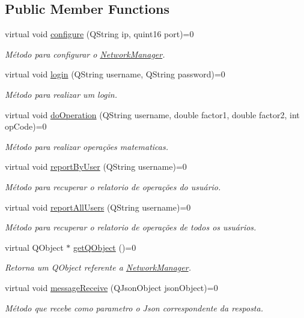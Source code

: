 \subsection*{Public Member Functions}
\begin{DoxyCompactItemize}
\item 
virtual void \hyperlink{classNetworkManager_ae7b073b1deb224a6cb7af0e4d3d158de}{configure} (Q\+String ip, quint16 port)=0
\begin{DoxyCompactList}\small\item\em Método para configurar o \hyperlink{classNetworkManager}{Network\+Manager}. \end{DoxyCompactList}\item 
virtual void \hyperlink{classNetworkManager_ad39555f78185618bb5e6e906a9ef0c40}{login} (Q\+String username, Q\+String password)=0
\begin{DoxyCompactList}\small\item\em Método para realizar um login. \end{DoxyCompactList}\item 
virtual void \hyperlink{classNetworkManager_a7477e7bdee53e76ead1b711d2976e1e1}{do\+Operation} (Q\+String username, double factor1, double factor2, int op\+Code)=0
\begin{DoxyCompactList}\small\item\em Método para realizar operações matematicas. \end{DoxyCompactList}\item 
virtual void \hyperlink{classNetworkManager_a1d37ebe528cb047d40bbacd950e0ef83}{report\+By\+User} (Q\+String username)=0
\begin{DoxyCompactList}\small\item\em Método para recuperar o relatorio de operações do usuário. \end{DoxyCompactList}\item 
virtual void \hyperlink{classNetworkManager_a8c788f00be9ce6736cf3a1deac0b0906}{report\+All\+Users} (Q\+String username)=0
\begin{DoxyCompactList}\small\item\em Método para recuperar o relatorio de operações de todos os usuários. \end{DoxyCompactList}\item 
virtual Q\+Object $\ast$ \hyperlink{classNetworkManager_a437755d5e84ea8522515283ba11f4b77}{get\+Q\+Object} ()=0
\begin{DoxyCompactList}\small\item\em Retorna um Q\+Object referente a \hyperlink{classNetworkManager}{Network\+Manager}. \end{DoxyCompactList}\item 
virtual void \hyperlink{classNetworkManager_a5200afa56c88ff5d5779a39fec1ab33c}{message\+Receive} (Q\+Json\+Object json\+Object)=0
\begin{DoxyCompactList}\small\item\em Método que recebe como parametro o Json correspondente da resposta. \end{DoxyCompactList}\end{DoxyCompactItemize}
